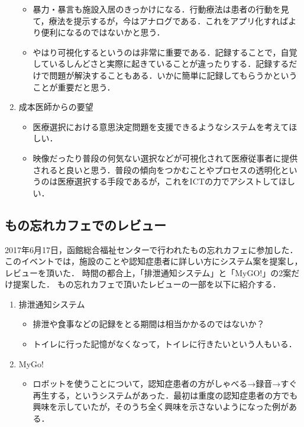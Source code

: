 \documentclass[../report]{subfiles}
\begin{document}
\begin{enumerate}
\begin{itemize}
            \item 暴力・暴言も施設入居のきっかけになる．行動療法は患者の行動を見て，療法を提示するが，今はアナログである．これをアプリ化すればより便利になるのではないかと思う．
            \item やはり可視化するというのは非常に重要である．記録することで，自覚しているしんどさと実際に起きていることが違ったりする．記録するだけで問題が解決することもある．いかに簡単に記録してもらうかということが重要だと思う．
        \end{itemize}
   \item 成本医師からの要望
        \begin{itemize}
            \item 医療選択における意思決定問題を支援できるようなシステムを考えてほしい．
            \item 映像だったり普段の何気ない選択などが可視化されて医療従事者に提供されると良いと思う．普段の傾向をつかむことやプロセスの透明化というのは医療選択する手段であるが，これをICTの力でアシストしてほしい．
        \end{itemize}
\end{enumerate}

\subsection{もの忘れカフェでのレビュー}
2017年6月17日，函館総合福祉センターで行われたもの忘れカフェに参加した．
このイベントでは，施設のことや認知症患者に詳しい方にシステム案を提案し，レビューを頂いた．
時間の都合上，「排泄通知システム」と「MyGO!」の2案だけ提案した．
もの忘れカフェで頂いたレビューの一部を以下に紹介する．
\begin{enumerate}
    \item 排泄通知システム
        \begin{itemize}
            \item 排泄や食事などの記録をとる期間は相当かかるのではないか？
            \item トイレに行った記憶がなくなって，トイレに行きたいという人もいる．
        \end{itemize}
    \item MyGo!
        \begin{itemize}
            \item ロボットを使うことについて，認知症患者の方がしゃべる→録音→すぐ再生する，というシステムがあった．最初は重度の認知症患者の方でも興味を示していたが，そのうち全く興味を示さないようになった例がある．
        \end{itemize}
\end{enumerate}
\end{document}
